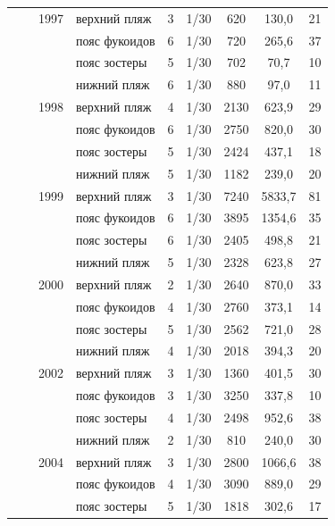 \begin{footnotesize}
\begin{center}
\begin{longtable}{|p{1.6cm}|p{2.3cm}|p{1cm}|p{2cm}|p{1.5cm}|p{1.3cm}|*{3}{c|}}
		\\ \cline{3-9}
		 &  & 1997 & верхний пляж & 3 & 1/30 & 620 & 130,0 & 21
		\\ \cline{4-9}
		 &  &  & пояс фукоидов & 6 & 1/30 & 720 & 265,6 & 37
		\\ \cline{4-9}
		 &  &  & пояс зостеры & 5 & 1/30 & 702 & 70,7 & 10
		\\ \cline{4-9}
		 &  &  & нижний пляж & 6 & 1/30 & 880 & 97,0 & 11
		\\ \cline{3-9}
		 &  & 1998 & верхний пляж & 4 & 1/30 & 2130 & 623,9 & 29
		\\ \cline{4-9}
		 &  &  & пояс фукоидов & 6 & 1/30 & 2750 & 820,0 & 30
		\\ \cline{4-9}
		 &  &  & пояс зостеры & 5 & 1/30 & 2424 & 437,1 & 18
		\\ \cline{4-9}
		 &  &  & нижний пляж & 5 & 1/30 & 1182 & 239,0 & 20
		\\ \cline{3-9}
		 &  & 1999 & верхний пляж & 3 & 1/30 & 7240 & 5833,7 & 81
		\\ \cline{4-9}
		 &  &  & пояс фукоидов & 6 & 1/30 & 3895 & 1354,6 & 35
		\\ \cline{4-9}
		 &  &  & пояс зостеры & 6 & 1/30 & 2405 & 498,8 & 21
		\\ \cline{4-9}
		 &  &  & нижний пляж & 5 & 1/30 & 2328 & 623,8 & 27
		\\ \cline{3-9}
		 &  & 2000 & верхний пляж & 2 & 1/30 & 2640 & 870,0 & 33
		\\ \cline{4-9}
		 &  &  & пояс фукоидов & 4 & 1/30 & 2760 & 373,1 & 14
		\\ \cline{4-9}
		 &  & & пояс зостеры & 5 & 1/30 & 2562 & 721,0 & 28
		\\ \cline{4-9}
		 &  &  & нижний пляж & 4 & 1/30 & 2018 & 394,3 & 20
		\\ \cline{3-9}
		 &  & 2002 & верхний пляж & 3 & 1/30 & 1360 & 401,5 & 30
		\\ \cline{4-9}
		 &  &  & пояс фукоидов & 3 & 1/30 & 3250 & 337,8 & 10
		\\ \cline{4-9}
		 &  &  & пояс зостеры & 4 & 1/30 & 2498 & 952,6 & 38
		\\ \cline{4-9}
		 &  &  & нижний пляж & 2 & 1/30 & 810 & 240,0 & 30
		\\ \cline{3-9}
		 &  & 2004 & верхний пляж & 3 & 1/30 & 2800 & 1066,6 & 38
		\\ \cline{4-9}
		 &  &  & пояс фукоидов & 4 & 1/30 & 3090 & 889,0 & 29
		\\ \cline{4-9}
		 &  &  & пояс зостеры & 5 & 1/30 & 1818 & 302,6 & 17
		\\ \cline{2-9}

\end{longtable}
\end{center}
\end{footnotesize}
